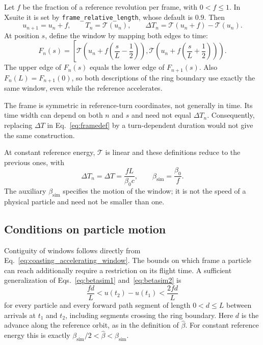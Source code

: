 Let $f$ be the fraction of a reference revolution per frame, with $0<f\leq1$.
In Xsuite it is set by \texttt{frame\_relative\_length}, whose default is $0.9$.
Then
\begin{equation}
u_{n+1}=u_n+f,\qquad
T_n=\mathcal{T}(u_n),\qquad
\Delta T_n=\mathcal{T}(u_n+f)-\mathcal{T}(u_n).
\label{eq:coasting_frame_clock}
\end{equation}
At position $s$, define the window by mapping both edges to time:
\begin{equation}
\boxed{
F_n(s)=\left[
\mathcal{T}\!\left(u_n+f\left(\frac{s}{L}-\frac12\right)\right),
\mathcal{T}\!\left(u_n+f\left(\frac{s}{L}+\frac12\right)\right)
\right).
}
\label{eq:coasting_accelerating_window}
\end{equation}
The upper edge of $F_n(s)$ equals the lower edge of $F_{n+1}(s)$.
Also $F_n(L)=F_{n+1}(0)$, so both descriptions of the ring boundary use
exactly the same window, even while the reference accelerates.

The frame is symmetric in reference-turn coordinates, not generally in time.
Its time width can depend on both $n$ and $s$ and need not equal
$\Delta T_n$. Consequently, replacing $\Delta T$ in
Eq.~\ref{eq:framedef} by a turn-dependent duration would not give the same
construction.

At constant reference energy, $\mathcal{T}$ is linear and these definitions
reduce to the previous ones, with
\begin{equation}
\Delta T_n=\Delta T=\frac{fL}{\beta_0c},\qquad
\beta_\text{sim}=\frac{\beta_0}{f}.
\end{equation}
The auxiliary $\beta_\text{sim}$ specifies the motion of the window; it is not
the speed of a physical particle and need not be smaller than one.

\subsection{Conditions on particle motion}

Contiguity of windows follows directly from Eq.~\ref{eq:coasting_accelerating_window}.
The bounds on which frame a particle can reach additionally require a
restriction on its flight time. A sufficient generalization of
Eqs.~\ref{eq:betasim1} and~\ref{eq:betasim2} is
\begin{equation}
\boxed{
\frac{fd}{L}<u(t_2)-u(t_1)<\frac{2fd}{L}
}
\label{eq:coasting_accelerating_speed_bound}
\end{equation}
for every particle and every forward path segment of length $0<d\leq L$ between
arrivals at $t_1$ and $t_2$, including segments crossing the ring boundary.
Here $d$ is the advance along the reference orbit, as in the definition of
$\hat\beta$. For constant reference energy this is exactly
$\beta_\text{sim}/2<\hat\beta<\beta_\text{sim}$.

